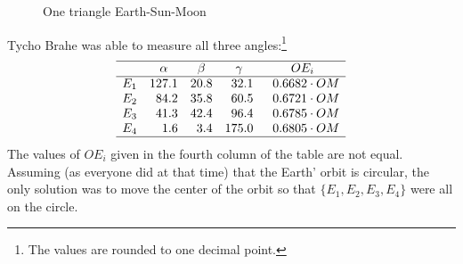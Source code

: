 \begin{figure}[t]
\begin{center}
\caption{One triangle Earth-Sun-Moon}\label{f.kepler-one-triangle}
\end{center}
\end{figure}


Tycho Brahe was able to measure all three angles:\footnote{The values are rounded to one decimal point.}
\[
\begin{array}{rrrrr}
\hline
& \multicolumn{1}{c}{\alpha} & \multicolumn{1}{c}{\beta} &
  \multicolumn{1}{c}{\gamma} & \multicolumn{1}{c}{OE_i} \\\hline
E_1 & 127.1 & 20.8  & 32.1 & \;\; 0.6682\cdot OM\\
E_2 & 84.2 & 35.8 & 60.5 & \;\;0.6721\cdot OM\\
E_3 & 41.3 & 42.4 &96.4 & \;\;0.6785\cdot OM\\
E_4 & 1.6& 3.4& 175.0 & \;\;0.6805\cdot OM\\
\hline
\end{array}
\]
The values of $OE_i$ given in the fourth column of the table are not equal. Assuming (as everyone did at that time) that the Earth' orbit is circular, the only solution was to move the center of the orbit so that $\{E_1,E_2,E_3,E_4\}$ were all on the circle.

